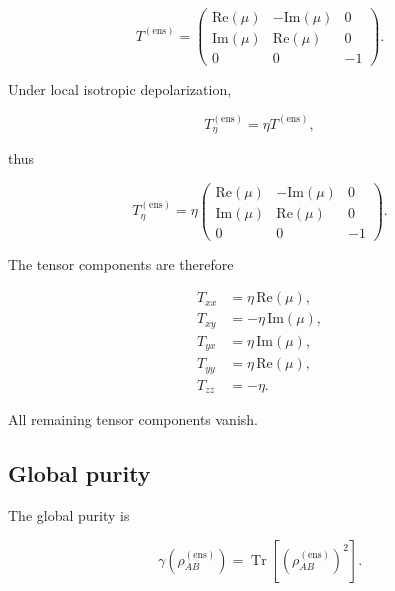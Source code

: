 \begin{equation}
T^{(\mathrm{ens})}
=
\begin{pmatrix}
\mathrm{Re}(\mu)
&
-\mathrm{Im}(\mu)
&
0
\\
\mathrm{Im}(\mu)
&
\mathrm{Re}(\mu)
&
0
\\
0
&
0
&
-1
\end{pmatrix}.
\label{eq:appendix_ensemble_tensor}
\end{equation}

\medskip

Under local isotropic depolarization,

\begin{equation}
T_{\eta}^{(\mathrm{ens})}
=
\eta
T^{(\mathrm{ens})},
\label{eq:appendix_ensemble_tensor_contraction}
\end{equation}

thus

\begin{equation}
T_{\eta}^{(\mathrm{ens})}
=
\eta
\begin{pmatrix}
\mathrm{Re}(\mu)
&
-\mathrm{Im}(\mu)
&
0
\\
\mathrm{Im}(\mu)
&
\mathrm{Re}(\mu)
&
0
\\
0
&
0
&
-1
\end{pmatrix}.
\label{eq:appendix_final_ensemble_tensor}
\end{equation}

The tensor components are therefore

\begin{align}
T_{xx}
&=
\eta\,\mathrm{Re}(\mu),
\\
T_{xy}
&=
-\eta\,\mathrm{Im}(\mu),
\\
T_{yx}
&=
\eta\,\mathrm{Im}(\mu),
\\
T_{yy}
&=
\eta\,\mathrm{Re}(\mu),
\\
T_{zz}
&=
-\eta.
\end{align}

All remaining tensor components vanish.


\subsection*{Global purity}

The global purity is

\begin{equation}
\gamma
\left(
\rho_{AB}^{(\mathrm{ens})}
\right)
=
\operatorname{Tr}
\left[
\left(
\rho_{AB}^{(\mathrm{ens})}
\right)^2
\right].
\end{equation}

